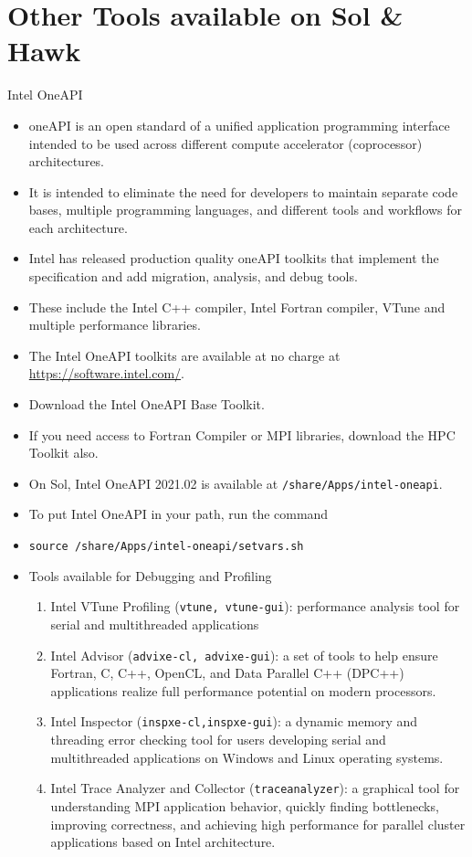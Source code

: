 \documentclass[10pt,t]{beamer}
\begin{document}
\section{Other Tools available on Sol \& Hawk}
\begin{frame}{Intel OneAPI}
  \begin{itemize}
  \item oneAPI is an open standard of a unified application programming interface intended to be used across different compute accelerator (coprocessor) architectures.
  \item It is intended to eliminate the need for developers to maintain separate code bases, multiple programming languages, and different tools and workflows for each architecture.
  \item Intel has released production quality oneAPI toolkits that implement the specification and add migration, analysis, and debug tools. 
  \item These include the Intel C++ compiler, Intel Fortran compiler, VTune and multiple performance libraries.
  \item The Intel OneAPI toolkits are available at no charge at {\color{lublue}\url{https://software.intel.com/}}.
  \item Download the Intel OneAPI Base Toolkit. 
  \item If you need access to Fortran Compiler or MPI libraries, download the HPC Toolkit also. 
    \framebreak
  \item On Sol, Intel OneAPI 2021.02 is available at \lstinline|/share/Apps/intel-oneapi|.
  \item To put Intel OneAPI in your path, run the command
  \item[] \lstinline|source /share/Apps/intel-oneapi/setvars.sh|
  \item Tools available for Debugging and Profiling
    \begin{enumerate}
      \item Intel VTune Profiling (\lstinline|vtune, vtune-gui|): performance analysis tool for serial and multithreaded applications
      \item Intel Advisor (\lstinline|advixe-cl, advixe-gui|): a set of tools to help ensure Fortran, C, C++, OpenCL, and Data Parallel C++ (DPC++) applications realize full performance potential on modern processors.
      \item Intel Inspector (\lstinline|inspxe-cl,inspxe-gui|): a dynamic memory and threading error checking tool for users developing serial and multithreaded applications on Windows and Linux operating systems.
      \item Intel Trace Analyzer and Collector (\lstinline|traceanalyzer|): a graphical tool for understanding MPI application behavior, quickly finding bottlenecks, improving correctness, and achieving high performance for parallel cluster applications based on Intel architecture.
    \end{enumerate}
  \end{itemize}
\end{frame}
\end{document}
